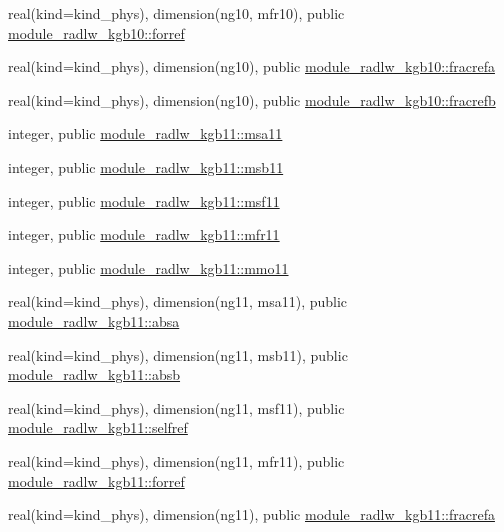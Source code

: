 \begin{DoxyCompactItemize}
\item 
real(kind=kind\+\_\+phys), dimension(ng10, mfr10), public \hyperlink{group__module__radlw__main_gaf70e39048d571053790289549dd8333a}{module\+\_\+radlw\+\_\+kgb10\+::forref}
\item 
real(kind=kind\+\_\+phys), dimension(ng10), public \hyperlink{group__module__radlw__main_gaa8bbfdaf370e12ae26d2ee3c464bdbc2}{module\+\_\+radlw\+\_\+kgb10\+::fracrefa}
\item 
real(kind=kind\+\_\+phys), dimension(ng10), public \hyperlink{group__module__radlw__main_ga07d5bac00d30f1ab873a0542b28d7e83}{module\+\_\+radlw\+\_\+kgb10\+::fracrefb}
\item 
integer, public \hyperlink{namespacemodule__radlw__kgb11_afd15a7b87b3d49c53c12e023c604b360}{module\+\_\+radlw\+\_\+kgb11\+::msa11}
\item 
integer, public \hyperlink{group__module__radlw__main_gaa8630868015cb7e358107e6418e35276}{module\+\_\+radlw\+\_\+kgb11\+::msb11}
\item 
integer, public \hyperlink{group__module__radlw__main_ga7dcec9b9f19a3f5f13d443572d834628}{module\+\_\+radlw\+\_\+kgb11\+::msf11}
\item 
integer, public \hyperlink{group__module__radlw__main_ga9b5764441999cce52bc02e65a24420b9}{module\+\_\+radlw\+\_\+kgb11\+::mfr11}
\item 
integer, public \hyperlink{group__module__radlw__main_ga6aabd24aa785ef8689c63b01aaaab243}{module\+\_\+radlw\+\_\+kgb11\+::mmo11}
\item 
real(kind=kind\+\_\+phys), dimension(ng11, msa11), public \hyperlink{group__module__radlw__main_ga7ac883387aa86a635c9aea011c55a1d5}{module\+\_\+radlw\+\_\+kgb11\+::absa}
\item 
real(kind=kind\+\_\+phys), dimension(ng11, msb11), public \hyperlink{group__module__radlw__main_gacf37465675961812e07616e42b137d70}{module\+\_\+radlw\+\_\+kgb11\+::absb}
\item 
real(kind=kind\+\_\+phys), dimension(ng11, msf11), public \hyperlink{group__module__radlw__main_gac98edefcce668d56c3aadc241863741f}{module\+\_\+radlw\+\_\+kgb11\+::selfref}
\item 
real(kind=kind\+\_\+phys), dimension(ng11, mfr11), public \hyperlink{group__module__radlw__main_ga9239d06fcd3fca0f13302c1ae4eb5a60}{module\+\_\+radlw\+\_\+kgb11\+::forref}
\item 
real(kind=kind\+\_\+phys), dimension(ng11), public \hyperlink{group__module__radlw__main_ga5bf6552fb9c1e7c35729b2aea885306e}{module\+\_\+radlw\+\_\+kgb11\+::fracrefa}

\end{DoxyCompactItemize}
